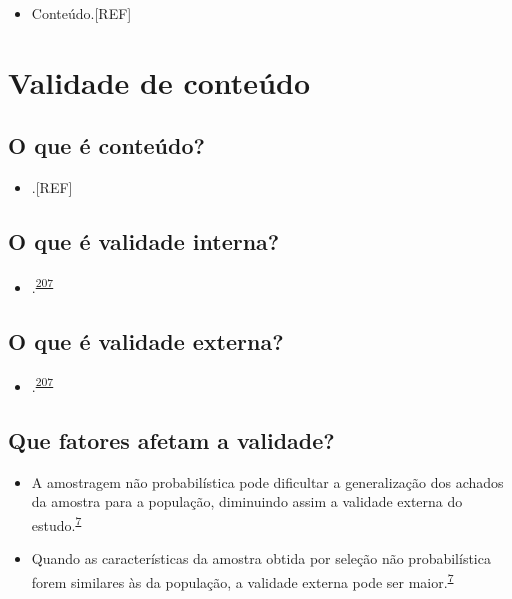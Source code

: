 \documentclass[
  a4paper,
]{book}
\providecommand{\tightlist}{%
  \setlength{\itemsep}{0pt}\setlength{\parskip}{0pt}}
\begin{document}
\begin{itemize}
\tightlist
\item
  Conteúdo.{[}REF{]}
\end{itemize}

\hypertarget{validade-conteuxfado}{%
\section{Validade de conteúdo}\label{validade-conteuxfado}}

\hypertarget{o-que-uxe9-conteuxfado}{%
\subsection{O que é conteúdo?}\label{o-que-uxe9-conteuxfado}}

\begin{itemize}
\tightlist
\item
  .{[}REF{]}
\end{itemize}

\hypertarget{o-que-uxe9-validade-interna}{%
\subsection{O que é validade interna?}\label{o-que-uxe9-validade-interna}}

\begin{itemize}
\tightlist
\item
  .\textsuperscript{\protect\hyperlink{ref-findley2021}{207}}
\end{itemize}

\hypertarget{o-que-uxe9-validade-externa}{%
\subsection{O que é validade externa?}\label{o-que-uxe9-validade-externa}}

\begin{itemize}
\tightlist
\item
  .\textsuperscript{\protect\hyperlink{ref-findley2021}{207}}
\end{itemize}

\hypertarget{que-fatores-afetam-a-validade}{%
\subsection{Que fatores afetam a validade?}\label{que-fatores-afetam-a-validade}}

\begin{itemize}
\item
  A amostragem não probabilística pode dificultar a generalização dos achados da amostra para a população, diminuindo assim a validade externa do estudo.\textsuperscript{\protect\hyperlink{ref-Banerjee2010}{7}}
\item
  Quando as características da amostra obtida por seleção não probabilística forem similares às da população, a validade externa pode ser maior.\textsuperscript{\protect\hyperlink{ref-Banerjee2010}{7}}
\end{itemize}
\end{document}
